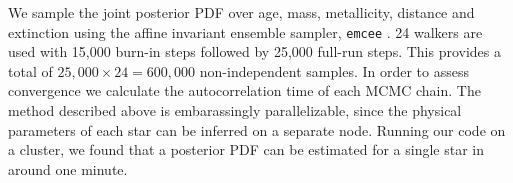 We sample the joint posterior PDF over age, mass, metallicity, distance and
extinction using the affine invariant ensemble sampler, {\tt emcee}
\citep{foreman-mackey2013}.
24 walkers are used with 15,000 burn-in steps followed by 25,000 full-run
steps.
This provides a total of $25,000 \times 24 = 600,000$ non-independent samples.
In order to assess convergence we calculate the autocorrelation time of each
MCMC chain.
The method described above is embarassingly parallelizable, since the physical
parameters of each star can be inferred on a separate node.
Running our code on a cluster, we found that a posterior PDF can be estimated
for a single star in around one minute.

